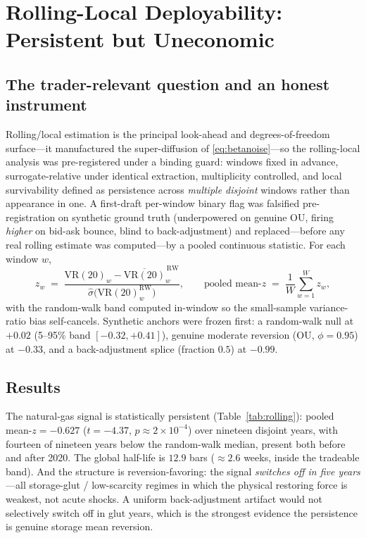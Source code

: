 \documentclass[11pt,a4paper]{article}
\newcommand{\VR}{\mathrm{VR}}
\begin{document}
\section{Rolling-Local Deployability: Persistent but Uneconomic}
\label{sec:rolling}

\subsection{The trader-relevant question and an honest instrument}

Rolling/local estimation is the principal look-ahead and degrees-of-freedom surface---it manufactured
the super-diffusion of \eqref{eq:betanoise}---so the rolling-local analysis was pre-registered under a
binding guard: windows fixed in advance, surrogate-relative under identical extraction, multiplicity
controlled, and local survivability defined as persistence across \emph{multiple disjoint} windows
rather than appearance in one. A first-draft per-window binary flag was falsified pre-registration on
synthetic ground truth (underpowered on genuine OU, firing \emph{higher} on bid-ask bounce, blind to
back-adjustment) and replaced---before any real rolling estimate was computed---by a pooled continuous
statistic. For each window $w$,
\begin{equation}
z_w \;=\; \frac{\VR(20)_w - \overline{\VR(20)}^{\,\mathrm{RW}}_w}{\widehat{\sigma}\big(\VR(20)^{\mathrm{RW}}_w\big)},
\qquad
\text{pooled mean-}z \;=\; \frac{1}{W}\sum_{w=1}^{W} z_w,
\label{eq:poolz}
\end{equation}
with the random-walk band computed in-window so the small-sample variance-ratio bias self-cancels.
Synthetic anchors were frozen first: a random-walk null at $+0.02$ (5--95\% band $[-0.32,+0.41]$),
genuine moderate reversion (OU, $\phi=0.95$) at $-0.33$, and a back-adjustment splice (fraction $0.5$)
at $-0.99$.

\subsection{Results}

The natural-gas signal is statistically persistent (Table~\ref{tab:rolling}): pooled mean-$z=-0.627$
($t=-4.37$, $p\approx 2\times 10^{-4}$) over nineteen disjoint years, with fourteen of nineteen years
below the random-walk median, present both before and after 2020. The global half-life is $12.9$ bars
($\approx 2.6$ weeks, inside the tradeable band). And the structure is reversion-favoring: the signal
\emph{switches off in five years}---all storage-glut / low-scarcity regimes in which the physical
restoring force is weakest, not acute shocks. A uniform back-adjustment artifact would not selectively
switch off in glut years, which is the strongest evidence the persistence is genuine storage mean
reversion.
\end{document}
